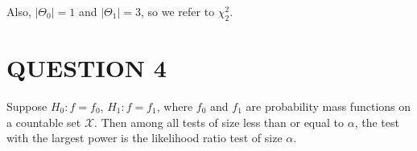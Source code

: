 \documentclass[a4paper]{article}
\begin{document}
Also, $ \left| \Theta_{0} \right| = 1 $ and $ \left| \Theta_{1} \right| = 3 $, so we refer to $ \chi_{2}^{2} $. 




\section{QUESTION 4}

\begin{lemma}
	Suppose $H_0: f = f_0$, $H_1: f = f_1$, where $f_0$ and $f_1$ are probability mass functions on a countable set $ \mathcal{X} $. Then among all tests of size less than or equal to $\alpha$, the test with the largest power is the likelihood ratio test of size $\alpha$.
\end{lemma}
\end{document}
